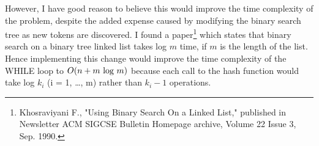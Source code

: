 \documentclass{article}
\begin{document}
 However, I have good reason to believe this would improve the time complexity of the problem, despite the added expense caused by modifying the binary search tree as new tokens are discovered. I found a paper\footnote{ Khosraviyani F., "Using Binary Search On a Linked List," published in Newsletter ACM SIGCSE Bulletin Homepage archive, Volume 22 Issue 3, Sep. 1990.}  which states that binary search on a binary tree linked list takes log $m$ time, if $m$ is the length of the list.  Hence implementing this change would improve the time complexity of the WHILE loop to $O(n + m \textnormal{ log } m)$ because each call to the hash function would take log $k_i$ (i = 1, \dots, m) rather than $k_i - 1$ operations. 
  
\end{document}
